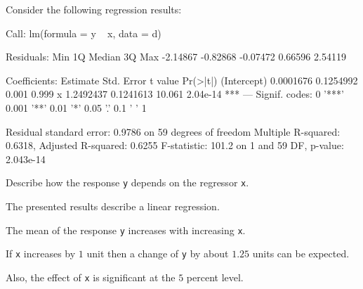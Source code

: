 
\begin{question}
Consider the following regression results:

\begin{Schunk}
\begin{Soutput}
Call:
lm(formula = y ~ x, data = d)

Residuals:
     Min       1Q   Median       3Q      Max 
-2.14867 -0.82868 -0.07472  0.66596  2.54119 

Coefficients:
             Estimate Std. Error t value Pr(>|t|)    
(Intercept) 0.0001676  0.1254992   0.001    0.999    
x           1.2492437  0.1241613  10.061 2.04e-14 ***
---
Signif. codes:  0 '***' 0.001 '**' 0.01 '*' 0.05 '.' 0.1 ' ' 1

Residual standard error: 0.9786 on 59 degrees of freedom
Multiple R-squared:  0.6318,	Adjusted R-squared:  0.6255 
F-statistic: 101.2 on 1 and 59 DF,  p-value: 2.043e-14
\end{Soutput}
\end{Schunk}

Describe how the response \texttt{y} depends on the regressor \texttt{x}.
\end{question}

\begin{solution}
The presented results describe a linear regression.

The mean of the response \texttt{y} increases with increasing \texttt{x}.

If \texttt{x} increases by $1$ unit then a change of \texttt{y} by about $1.25$ units can be expected.

Also, the effect of \texttt{x} is  significant at the $5$ percent level.
\end{solution}


